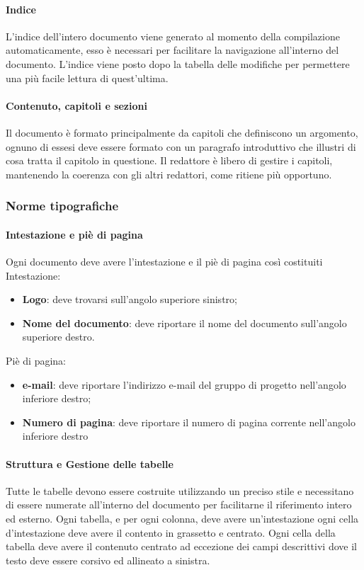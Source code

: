   \paragraph{Indice}
  L'indice dell'intero documento viene generato al momento della compilazione
  automaticamente, esso è necessari per facilitare la navigazione all'interno del
  documento.
  L'indice viene posto dopo la tabella delle modifiche per permettere una più facile
  lettura di quest'ultima.
  \paragraph{Contenuto, capitoli e sezioni}
  Il documento è formato principalmente da capitoli che definiscono un argomento,
  ognuno di essesi deve essere formato con un paragrafo introduttivo che illustri
  di cosa tratta il capitolo in questione.
  Il redattore è libero di gestire i capitoli, mantenendo la coerenza con gli altri
  redattori, come ritiene più opportuno.
  \subsubsection{Norme tipografiche}
  \paragraph{Intestazione e piè di pagina}
  Ogni documento deve avere l'intestazione e il piè di pagina così costituiti
  Intestazione:
  \begin{itemize}
    \item \textbf{Logo}: deve trovarsi sull'angolo superiore sinistro;
    \item \textbf{Nome del documento}: deve riportare il nome del documento sull'angolo superiore destro.
  \end{itemize}
  Piè di pagina:
  \begin{itemize}
    \item \textbf{e-mail}: deve riportare l'indirizzo e-mail del gruppo di progetto
    nell'angolo inferiore destro;
    \item \textbf{Numero di pagina}: deve riportare il numero di pagina corrente
     nell'angolo inferiore destro
  \end{itemize}

  \paragraph{Struttura e Gestione delle tabelle}
  Tutte le tabelle devono essere costruite utilizzando un preciso stile e necessitano
  di essere numerate all'interno del documento per facilitarne il riferimento
  intero ed esterno.
  Ogni tabella, e per ogni colonna, deve avere un'intestazione ogni cella d'intestazione
  deve avere il contento in grassetto e centrato.
  Ogni cella della tabella deve avere il contenuto centrato ad eccezione dei campi
  descrittivi dove il testo deve essere corsivo ed allineato a sinistra.

